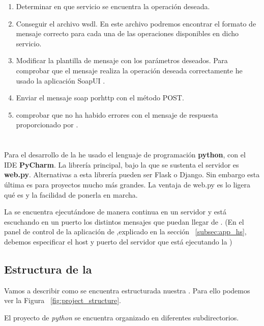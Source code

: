 \begin{enumerate}
	\item Determinar en que servicio se encuentra la operación deseada.
	\item Conseguir el archivo \acrshort{wsdl}. En este archivo podremos encontrar el formato de mensaje correcto para cada una de las operaciones disponibles en dicho servicio.
	\item Modificar la plantilla de mensaje con los parámetros deseados. 
	Para comprobar que el mensaje realiza la operación deseada correctamente he usado la aplicación SoapUI \cite{soapui}.
	\item Enviar el mensaje \acrshort{soap} por\acrshort{http} con el método POST.
	\item comprobar que no ha habido errores con el mensaje de respuesta proporcionado por \wday.
\end{enumerate}



\section{\iface{}}


Para el desarrollo de la \iface{} he usado el lenguaje de programación \textbf{python}, con el IDE \textbf{PyCharm}. La librería principal, bajo la que se sustenta el servidor es \textbf{web.py}.
Alternativas a esta librería pueden ser Flask o Django. Sin embargo esta última es para proyectos mucho más grandes. La ventaja de web.py es lo ligera qué es y la facilidad de ponerla en marcha.

La \iface{} se encuentra ejecutándose de manera continua en un servidor y está escuchando en un puerto los distintos mensajes que puedan llegar de \hs.
(En el panel de control de la aplicación de \hs{} ,explicado en la sección ~\ref{subsec:app_hs}, debemos especificar el host y puerto del servidor que está ejecutando la \iface{})


\subsection{Estructura de la \iface{}}
Vamos a describir como se encuentra estructurada nuestra \iface. Para ello podemos ver la Figura ~\ref{fig:project_structure}. 

El proyecto de \textit{python} se encuentra organizado en diferentes subdirectorios.

